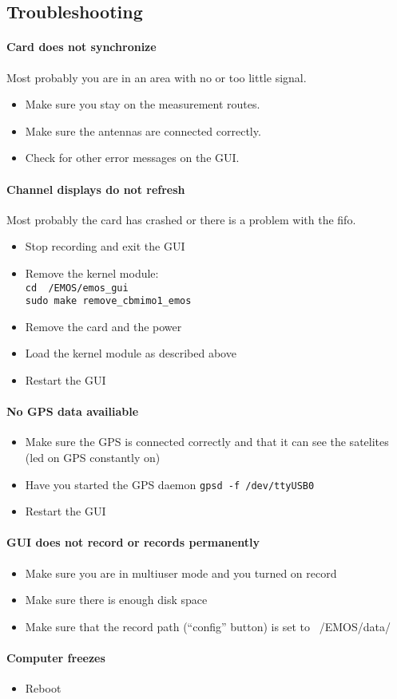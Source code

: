 \documentclass[10pt,a4paper]{article}
\begin{document}
\subsection{Troubleshooting}

\paragraph{Card does not synchronize} 
Most probably you are in an area with no or too little signal. 
\begin{itemize}
\item Make sure you stay on the measurement routes. 
\item Make sure the antennas are connected correctly. 
\item Check for other error messages on the GUI.
\end{itemize}

\paragraph{Channel displays do not refresh} 
Most probably the card has crashed or there is a problem with the fifo. 
\begin{itemize}
\item Stop recording and exit the GUI
\item Remove the kernel module:\\
      {\tt cd ~/EMOS/emos\_gui}\\
      {\tt sudo make remove\_cbmimo1\_emos}
\item Remove the card and the power
\item Load the kernel module as described above
\item Restart the GUI
\end{itemize}

\paragraph{No GPS data availiable}
\begin{itemize}
\item Make sure the GPS is connected correctly and that it can see the satelites (led on GPS constantly on)
\item Have you started the GPS daemon {\tt gpsd -f /dev/ttyUSB0}
\item Restart the GUI
\end{itemize}

\paragraph{GUI does not record or records permanently}
\begin{itemize}
\item Make sure you are in multiuser mode and you turned on record
\item Make sure there is enough disk space
\item Make sure that the record path (``config'' button) is set to ~/EMOS/data/
\end{itemize}

\paragraph{Computer freezes} 
\begin{itemize}
\item Reboot
\end{itemize}
\end{document}
